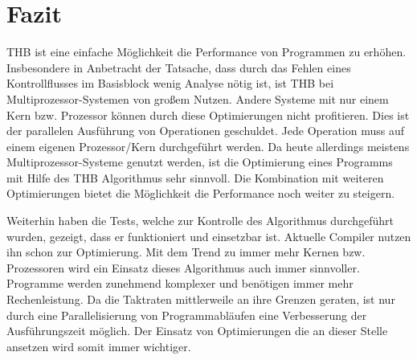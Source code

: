 \chapter{Fazit}
\ac{THB} ist eine einfache Möglichkeit die Performance von Programmen zu erhöhen. Insbesondere in Anbetracht der Tatsache, dass durch das Fehlen eines Kontrollflusses im Basisblock wenig Analyse nötig ist, ist \ac{THB} bei Multiprozessor-Systemen von großem Nutzen. Andere Systeme mit nur einem Kern bzw. Prozessor können durch diese Optimierungen nicht profitieren. Dies ist der parallelen Ausführung von Operationen geschuldet. Jede Operation muss auf einem eigenen Prozessor/Kern durchgeführt werden. Da heute allerdings meistens Multiprozessor-Systeme genutzt werden, ist die Optimierung eines Programms mit Hilfe des \ac{THB} Algorithmus sehr sinnvoll. Die Kombination mit weiteren Optimierungen bietet die Möglichkeit die Performance noch weiter zu steigern.

Weiterhin haben die Tests, welche zur Kontrolle des Algorithmus durchgeführt wurden, gezeigt, dass er funktioniert und einsetzbar ist. Aktuelle Compiler nutzen ihn schon zur Optimierung. Mit dem Trend zu immer mehr Kernen bzw. Prozessoren wird ein Einsatz dieses Algorithmus auch immer sinnvoller. Programme werden zunehmend komplexer und benötigen immer mehr Rechenleistung. Da die Taktraten mittlerweile an ihre Grenzen geraten, ist nur durch eine Parallelisierung von Programmabläufen eine Verbesserung der Ausführungszeit möglich. Der Einsatz von Optimierungen die an dieser Stelle ansetzen wird somit immer wichtiger.
